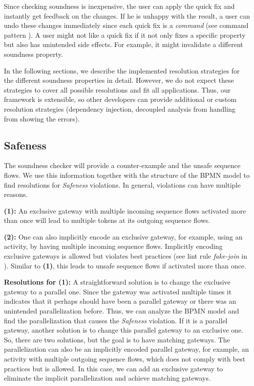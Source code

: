 \documentclass[runningheads]{llncs}
\begin{document}
Since checking soundness is inexpensive, the user can apply the quick fix and instantly get feedback on the changes.
If he is unhappy with the result, a user can undo these changes immediately since each quick fix is a \textit{command} (see command pattern \cite{gammaDesignPatternsElements1995}).
A user might not like a quick fix if it not only fixes a specific property but also has unintended side effects.
For example, it might invalidate a different soundness property.

In the following sections, we describe the implemented resolution strategies for the different soundness properties in detail.
However, we do not expect these strategies to cover all possible resolutions and fit all applications.
Thus, our framework is extensible, so other developers can provide additional or custom resolution strategies (dependency injection, decoupled analysis from handling from showing the errors).

\subsection{Safeness} \label{subsec:safeness}
The soundness checker will provide a counter-example and the unsafe sequence flows.
We use this information together with the structure of the BPMN model to find resolutions for \textit{Safeness} violations.
In general, violations can have multiple reasons.

\textbf{(1):} An exclusive gateway with multiple incoming sequence flows activated more than once will lead to multiple tokens at its outgoing sequence flows.

\textbf{(2):} One can also implicitly encode an exclusive gateway, for example, using an activity, by having multiple incoming sequence flows.
Implicitly encoding exclusive gateways is allowed but violates best practices (see lint rule \textit{fake-join} in \cite{camundaservicesgmbhBpmnlint2024}).
Similar to \textbf{(1)}, this leads to unsafe sequence flows if activated more than once.


\textbf{Resolutions for (1):} A straightforward solution is to change the exclusive gateway to a parallel one.
Since the gateway was activated multiple times it indicates that it perhaps should have been a parallel gateway or there was an unintended parallelization before.
Thus, we can analyze the BPMN model and find the parallelization that causes the \textit{Safeness} violation.
If it is a parallel gateway, another solution is to change this parallel gateway to an exclusive one.
So, there are two solutions, but the goal is to have matching gateways.
The parallelization can also be an implicitly encoded parallel gateway, for example, an activity with multiple outgoing sequence flows, which does not comply with best practices but is allowed.
In this case, we can add an exclusive gateway to eliminate the implicit parallelization and achieve matching gateways.
\end{document}

